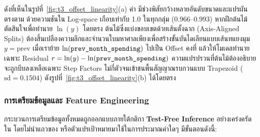 \begin{insightbox}
ดังที่เห็นในรูปที่~\ref{fig:t3_offset_linearity}(a) ค่า  มีช่วงพิสัยกว้างหลายอันดับขนาดและแปรผันตรงตาม  ด้วยความชันใน Log-space เกือบเท่ากับ 1.0 ในทุกกลุ่ม ($0.966$--$0.993$) หากฝึกต้นไม้ตัดสินใจเพื่อทำนาย $\ln(y)$ โดยตรง ต้นไม้ซึ่งแบ่งขอบเขตด้วยเส้นตั้งฉาก (Axis-Aligned Splits) ต้องสิ้นเปลืองความลึกและจำนวนใบมหาศาลเพียงเพื่อสร้างขั้นบันไดเลียนแบบเส้นทแยงมุม $y = \text{prev}$ เมื่อเราย้าย $\ln(\text{\texttt{prev\_month\_spending}})$ ไปเป็น Offset คงที่ แล้วให้โมเดลทำนายเฉพาะ Residual $r = \ln(y) - \ln(\text{\texttt{prev\_month\_spending}})$ ความแปรปรวนที่ต้นไม้ต้องอธิบายจะถูกบีบลงเหลือเฉพาะ Step Factors ไม่กี่ตัวจนเข้าชนพื้นสัญญาณรบกวนแบบ Trapezoid ($\text{sd} = 0.1504$) ดังรูปที่~\ref{fig:t3_offset_linearity}(b) ได้โดยตรง
\end{insightbox}

\subsubsection{การเตรียมข้อมูลและ Feature Engineering}
\label{subsubsec:t3_fe}

กระบวนการเตรียมข้อมูลทั้งหมดถูกออกแบบภายใต้กติกา \textbf{Test-Free Inference} อย่างเคร่งครัดใน  โดยไม่นำแถวของ  หรือตัวแปรเป้าหมายมาใช้ในการประมาณค่าใดๆ มีขั้นตอนดังนี้:

